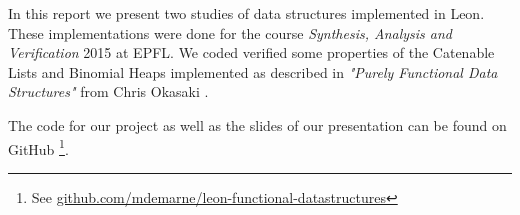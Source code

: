In this report we present two studies of data structures implemented in Leon. 
These implementations were done for the course \emph{Synthesis, Analysis and Verification} 2015 at EPFL.
We coded verified some properties of
the Catenable Lists and Binomial Heaps
implemented as described in \emph{"Purely Functional Data Structures"} from Chris Okasaki
\cite{Okasaki}.

The code for our project as well as the slides of our presentation 
can be found on GitHub
\footnote{See \href{https://github.com/mdemarne/leon-functional-datastructures}{github.com/mdemarne/leon-functional-datastructures}}.